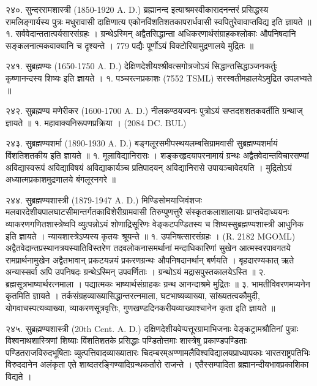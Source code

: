 २४०. सुन्दररामशास्त्री (1850-1920 A. D.)
ब्रह्मानन्द इत्याश्रमस्वीकारादनन्तरं प्रसिद्धस्य रामलिङ्गार्यस्य पुत्रः मधुरावासी दाक्षिणात्य एकोनविंशतिशतकापरार्धवासी स्वपितुरेवावाप्तविद्य इति ज्ञायते ॥
१. सर्ववेदान्ततात्पर्यसारसंग्रहः । ग्रन्थेऽस्मिन् अद्वैतसिद्धान्ता अधिकरणार्थसंग्राहकश्लोकाः औपनिषदानि सङ्कलनात्मकवाक्यानि च दृश्यन्ते । 779 पद्यैः पूर्णोऽयं विक्टोरियामुद्रणालये मुद्रितः ॥

२४१. सुब्रह्मण्यः (1650-1750 A. D.)
देक्षिणदेशीयश्श्रीवत्सगोत्रजोऽयं सिद्धान्तसिद्धाञ्जनकर्तुः कृष्णानन्दस्य शिष्यः इति ज्ञायते ।
१. पञ्चरत्नप्रकाशः (7552 TSML) सरस्वतीमहालयेऽमुद्रित उपलभ्यते ॥

२४२. सुब्रह्मण्य मणेरीकर (1600-1700 A. D.)
नीलकण्ठयज्वनः पुत्रोऽयं सप्तदशशतकवर्तीति ग्रन्थाज् ज्ञायते ॥
१. महावाक्यनिरूपणप्रक्रिया । (2084 DC. BUL)

२४३. सुब्रह्मण्यशर्मा (1890-1930 A. D.)
बङ्गलूरसमीपस्थयलम्बसिग्रामवासी सुब्रह्मण्यशर्मायं विंशतिशतकीय इति ज्ञायते ॥
१. मूलाविद्यानिरासः । शङ्करहृदयापरनामायं ग्रन्थः अद्वैतवेदान्तविचारसण्यां अविद्यास्वरूपं अविद्याविषयं अविद्याकार्यञ्च प्रतिपादयन् अविद्यानिरासे उपायञ्चावेदयति । मुद्रितोऽयं अध्यात्मप्रकाशमुद्रणालये बंगलूरनगरे ॥

२४४. सुब्रह्मण्यशास्त्री (1879-1947 A. D.)
मिण्डिसोमयाजिवंशजः मलवारदेशीयपालघाटसीमान्तर्गतकाविशेरीग्रामवासी तिरुप्पुणत्तुरै संस्कृतकलाशालायाः प्राप्तवेदाध्ययनः व्याकरणगणितशास्त्रेष्वपि व्युत्पन्नोऽयं शोणाद्रिसूरिणः वेङ्कटपण्डितस्य च शिष्यस्सुब्रह्मण्यशास्त्री आधुनिक इति ज्ञायते । न्यायशास्त्रेऽप्यस्य कृतयः श्रूयन्ते ॥
१. उपनिषत्सारसंग्रहः । (R. 2182 MGOML)
अद्वैतवेदान्तप्रस्थानत्रयस्यातिविस्तरेण तदवलोकनासमर्थानां मन्दाधिकारिणां सुखेन आत्मस्वरपावगतये रामप्रार्थनामुखेन अद्वैतभावान् प्रकटयन्नयं प्रकरणग्रन्थः औपनिषदानर्थान् बर्णयति । बृहदारण्यकात् ऋते अन्यास्सर्वा अपि उपनिषदः ग्रन्थेऽस्मिन् उपवर्णिताः । ग्रन्थोऽयं मद्रासपुस्तकालयेऽस्ति ॥
२. ब्रह्मसूत्रभाष्यार्थरत्नमाला । पद्यात्मकः भाष्यार्थसंग्राहकः ग्रन्थ आनन्दाश्रमे मुद्रितः ॥
३. भामतीविवरणमप्यनेन कृतमिति ज्ञायते ।
तर्कसंग्रहव्याख्यासिद्धान्तरत्नमाला, घटभाष्यव्याख्या, सांख्यतत्वकौमुदी, योगवाचस्पत्यव्याख्या, व्याकरणसूत्रवृत्तिः, गुणखण्डदिनकरीयव्याख्याश्चानेन कृता इति ज्ञायते ॥

२४५. सुब्रह्मण्यशास्त्री (20th Cent. A. D.)
दक्षिणदेशीयवेप्पत्तूरग्रामाभिजनाः वेङ्कट्रामश्रौतिनां पुत्राः विश्वनाथशास्त्रिणां शिष्याः विंशतिशतके प्रसिद्धाः पण्डितोत्तमाः शास्त्रेषु प्रकाण्डपण्डिताः पण्डितराजविरुदभूषिताः व्युत्पत्तिवादव्याख्यातारः चिदम्बरम्अण्णामलैविश्वविद्यालयप्राध्यापकाः भारतराष्ट्रपतिभिः विरुददानेन अलंकृता एते शाब्दतरङ्गिण्यादिग्रन्थकर्तारो राजन्ते । एतैस्सम्पादिता ब्रह्मानन्दीयभावप्रकाशिका विद्यते ।

